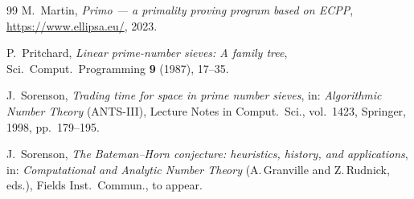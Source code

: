 \documentclass[11pt,a4paper]{article}
\theoremstyle{plain}
\theoremstyle{definition}
\theoremstyle{remark}
\begin{document}
\begin{thebibliography}{99}
M.~Martin,
\emph{Primo --- a primality proving program based on ECPP},
\url{https://www.ellipsa.eu/}, 2023.

P.~Pritchard,
\emph{Linear prime-number sieves: A family tree},
Sci.\ Comput.\ Programming \textbf{9} (1987), 17--35.

J.~Sorenson,
\emph{Trading time for space in prime number sieves},
in: \emph{Algorithmic Number Theory} (ANTS-III), Lecture Notes in Comput.\ Sci., vol.~1423, Springer, 1998, pp.~179--195.

J.~Sorenson,
\emph{The Bateman--Horn conjecture: heuristics, history, and applications},
in: \emph{Computational and Analytic Number Theory} (A.\,Granville and Z.\,Rudnick, eds.), Fields Inst.\ Commun., to appear.

\end{thebibliography}
\end{document}
